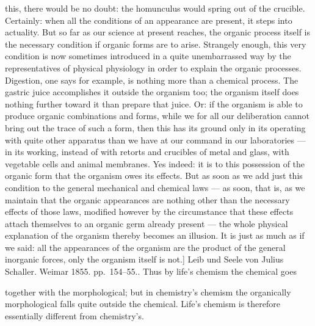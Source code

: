 \documentclass[12pt,a4paper]{book}
\begin{document}
{this, there would be no doubt: the homunculus would spring out of the crucible.
Certainly: when all the conditions of an appearance are present, it steps into
actuality. But so far as our science at present reaches, the organic process
itself is the necessary condition if organic forms are to arise. Strangely
enough, this very condition is now sometimes introduced in a quite unembarrassed
way by the representatives of physical physiology in order to explain the
organic processes. Digestion, one says for example, is nothing more than a
chemical process. The gastric juice accomplishes it outside the organism too;
the organism itself does nothing further toward it than prepare that juice. Or:
if the organism is able to produce organic combinations and forms, while we for
all our deliberation cannot bring out the trace of such a form, then this has
its ground only in its operating with quite other apparatus than we have at our
command in our laboratories --- in its working, instead of with retorts and
crucibles of metal and glass, with vegetable cells and animal membranes. Yes
indeed: it is to this possession of the organic form that the organism owes its
effects. But as soon as we add just this condition to the general mechanical and
chemical laws --- as soon, that is, as we maintain that the organic appearances
are nothing other than the necessary effects of those laws, modified however by
the circumstance that these effects attach themselves to an organic germ
already present --- the whole physical explanation of the organism thereby
becomes an illusion. It is just as much as if we said: all the appearances of
the organism are the product of the general inorganic forces, only the organism
itself is not.] Leib und Seele von Julius Schaller. Weimar 1855.
pp.~154--55.}. Thus by life's chemism the chemical goes

together with the morphological; but in chemistry's chemism the organically
morphological falls quite outside the chemical. Life's chemism is therefore
essentially different from chemistry's.
\end{document}
